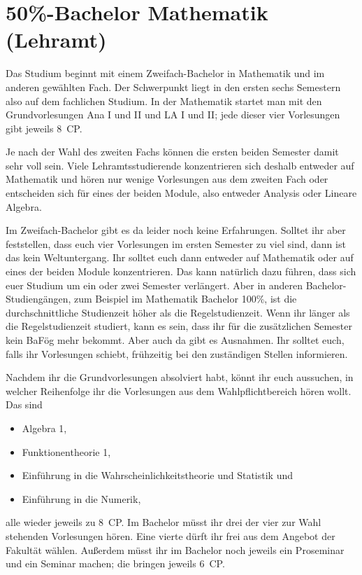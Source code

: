 \section{50\%-Bachelor Mathematik (Lehramt)}

Das Studium beginnt mit einem Zweifach-Bachelor in Mathematik und im anderen
gewählten Fach. Der Schwerpunkt liegt in den ersten sechs Semestern also auf
dem fachlichen Studium. In der Mathematik startet man mit den Grundvorlesungen
Ana I und II und LA I und II; jede dieser vier Vorlesungen gibt jeweils 8~CP.

Je nach der Wahl des zweiten Fachs können die ersten beiden Semester damit sehr
voll sein. Viele Lehramtsstudierende konzentrieren sich deshalb entweder auf
Mathematik und hören nur wenige Vorlesungen aus dem zweiten Fach oder
entscheiden sich für eines der beiden Module, also entweder Analysis oder
Lineare Algebra.

Im Zweifach-Bachelor gibt es da leider noch keine Erfahrungen. Solltet ihr
aber feststellen, dass euch vier Vorlesungen im ersten Semester zu viel sind,
dann ist das kein Weltuntergang. Ihr solltet euch dann entweder auf Mathematik
oder auf eines der beiden Module konzentrieren. Das kann natürlich dazu
führen, dass sich euer Studium um ein oder zwei Semester verlängert. Aber in
anderen Bachelor-Studiengängen, zum Beispiel im Mathematik Bachelor 100\%, ist
die durchschnittliche Studienzeit höher als die Regelstudienzeit.
Wenn ihr länger als die Regelstudienzeit studiert, kann es sein, dass ihr für
die zusätzlichen Semester kein BaFög mehr bekommt. Aber auch da gibt es
Ausnahmen. Ihr solltet euch, falls ihr Vorlesungen schiebt, frühzeitig bei den
zuständigen Stellen informieren.

Nachdem ihr die Grundvorlesungen absolviert habt, könnt ihr euch aussuchen, in
welcher Reihenfolge ihr die Vorlesungen aus dem Wahlpflichtbereich hören
wollt. Das sind
\begin{itemize}
  \item Algebra 1,
  \item Funktionentheorie 1,
  \item Einführung in die Wahrscheinlichkeitstheorie und Statistik und
  \item Einführung in die Numerik,
\end{itemize}
alle wieder jeweils zu 8~CP. Im Bachelor müsst ihr drei der vier zur Wahl
stehenden Vorlesungen hören. Eine vierte dürft ihr frei aus dem Angebot der
Fakultät wählen. Außerdem müsst ihr im Bachelor noch jeweils ein Proseminar und
ein Seminar machen; die bringen jeweils 6~CP.


